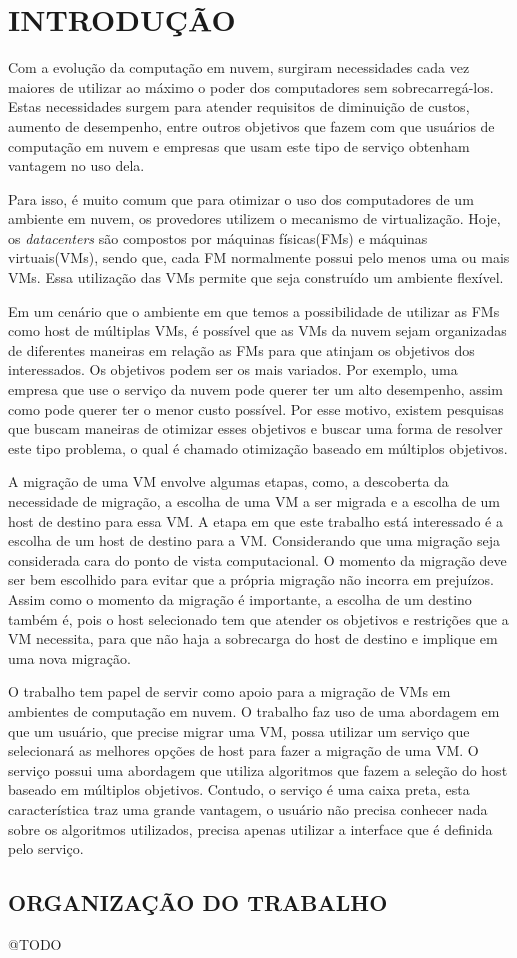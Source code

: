 \chapter{INTRODUÇÃO}
\label{chap:introducao}

Com a evolução da computação em nuvem, surgiram necessidades cada vez maiores de utilizar ao 
máximo o poder dos computadores sem sobrecarregá-los. Estas necessidades surgem para atender 
requisitos de diminuição de custos, aumento de desempenho, entre outros objetivos que fazem com que 
usuários de computação em nuvem e empresas que usam este tipo de serviço obtenham vantagem no uso dela.

Para isso, é muito comum que para otimizar o uso dos computadores de um ambiente em nuvem, 
os provedores utilizem o mecanismo de virtualização. Hoje, os \textit{datacenters} são compostos 
por máquinas físicas(FMs) e máquinas virtuais(VMs), sendo que, cada FM normalmente possui 
pelo menos uma ou mais VMs. Essa utilização das VMs permite que seja construído um ambiente flexível.

Em um cenário que o ambiente em que temos a possibilidade de utilizar as FMs como host de múltiplas VMs,
 é possível que as VMs da nuvem sejam organizadas de diferentes maneiras em relação as FMs para que atinjam 
 os objetivos dos interessados. Os objetivos podem ser os mais variados. Por exemplo, uma empresa que 
 use o serviço da nuvem pode querer ter um alto desempenho, assim como pode querer ter o menor custo 
 possível. Por esse motivo, existem pesquisas que buscam maneiras de otimizar esses objetivos e buscar 
 uma forma de resolver este tipo problema, o qual é chamado otimização baseado em múltiplos objetivos. 

A migração de uma VM envolve algumas etapas, como, a descoberta da necessidade de migração, 
a escolha de uma VM a ser migrada e a escolha de um host de destino para essa VM.
 A etapa em que este trabalho está interessado é a escolha de um host de destino para a VM. 
 Considerando que uma migração seja considerada cara do ponto de vista computacional. 
 O momento da migração deve ser bem escolhido para evitar que a própria migração não incorra em 
 prejuízos. Assim como o momento da migração é importante, a escolha de um destino também é, 
 pois o host selecionado tem que atender os objetivos e restrições que a VM necessita, para que 
 não haja a sobrecarga do host de destino e implique em uma nova migração.

O trabalho tem papel de servir como apoio para a migração de VMs em ambientes de computação em nuvem. 
O trabalho faz uso de uma abordagem em que um usuário, que precise migrar uma VM, possa 
utilizar um serviço que selecionará as melhores opções de host para fazer a migração de uma VM. 
O serviço possui uma abordagem que utiliza algoritmos que fazem a seleção do host baseado em múltiplos objetivos.
 Contudo, o serviço é uma caixa preta, esta característica traz uma grande vantagem, o usuário não precisa conhecer nada 
 sobre os algoritmos utilizados, precisa apenas utilizar a interface que é definida pelo serviço. 

\section{ORGANIZAÇÃO DO TRABALHO}
\label{sec:organizacaoTrabalho}

@TODO